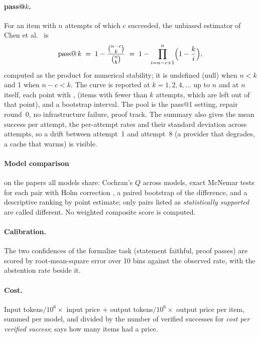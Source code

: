 \documentclass[11pt,a4paper]{article}
\begin{document}
\paragraph{pass@$k$.} For an item with $n$ attempts of which $c$ succeeded, the unbiased estimator of Chen et al.\ \cite{chen2021} is
\begin{equation}
\operatorname{pass@}k \;=\; 1 - \frac{\binom{n-c}{k}}{\binom{n}{k}} \;=\; 1 - \prod_{i=n-c+1}^{n}\Bigl(1 - \frac{k}{i}\Bigr),
\end{equation}
computed as the product for numerical stability; it is undefined (null) when $n < k$ and 1 when $n - c < k$. The curve is reported at $k = 1, 2, 4, \dots$ up to $n$ and at $n$ itself, each point with ,  (items with fewer than $k$ attempts, which are left out of that point),  and a bootstrap interval. The pool is the pass@1 setting, repair round~0, no infrastructure failure, proof track. The summary also gives the mean success per attempt, the per-attempt rates and their standard deviation across attempts, so a drift between attempt~1 and attempt~8 (a provider that degrades, a cache that warms) is visible.

\paragraph{Model comparison} on the papers all models share: Cochran's $Q$ \cite{cochran1950} across models, exact McNemar tests \cite{mcnemar1947} for each pair with Holm correction \cite{holm1979}, a paired bootstrap of the difference, and a descriptive ranking by point estimate; only pairs listed as \emph{statistically supported} are called different. No weighted composite score is computed.

\paragraph{Calibration.} The two confidences of the formalize task (statement faithful, proof passes) are scored by root-mean-square error over 10 bins against the observed rate, with the abstention rate beside it.

\paragraph{Cost.} Input tokens$/10^6 \times$ input price $+$ output tokens$/10^6 \times$ output price per item, summed per model, and divided by the number of verified successes for \emph{cost per verified success};  says how many items had a price.
\end{document}
